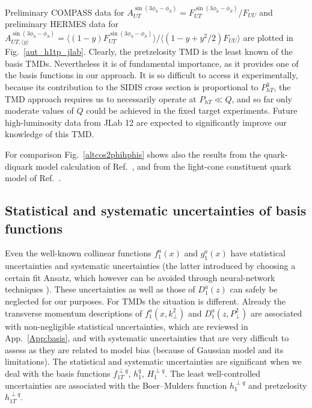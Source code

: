 \documentclass[a4paper,11pt]{article}
\newcommand{\blue}[1]{{\color{blue} #1}}
\newcommand{\la}{\langle}
\newcommand{\ra}{\rangle}
\newcommand{\ps}[1]{\blue{#1}}
\def\Phperp{P_{hT}}
\def\kperp{k_\perp}
\def\pperp{P_\perp}
\begin{document}
Preliminary COMPASS data \cite{Parsamyan:2013fia} for 
$A_{UT}^{\sin(3 \phi_h - \phi_S)}=F_{UT}^{\sin(3 \phi_h - \phi_S)}/F_{UU}$ and 
preliminary HERMES data \cite{Schnell:2010zza} for$
A_{UT, \langle y \rangle}^{\sin(3 \phi_h - \phi_S)}=\la
(1-y)F_{UT}^{\sin(3 \phi_h - \phi_S)}\ra/\la(1-y + y^2/2)F_{UU}\ra$
are plotted in Fig.~\ref{aut_h1tp_jlab}. 
Clearly, the pretzelosity TMD is the least known of the basis TMDs.
Nevertheless it is of fundamental importance, as it provides one of the
basis functions in our approach. It is so difficult to access it
experimentally, because its contribution to the SIDIS cross section
is proportional to $\Phperp^3$, the TMD approach requires us to
necessarily operate at $\Phperp\ll Q$, and so far only moderate
values of $Q$ could be achieved in the fixed target experiments.
Future high-luminosity data from JLab 12 are expected
to significantly improve our knowledge of this TMD.

For comparison Fig.~\ref{altcos2phihphis} shows also the results
from the quark-diquark model calculation of Ref.~\cite{Kotzinian:2008fe},
and from the light-cone constituent quark model of Ref.~\cite{Boffi:2009sh}.



\subsection{Statistical and systematic uncertainties of basis functions}

Even the well-known collinear functions $f_1^a(x)$ and $g_1^a(x)$ have
statistical uncertainties and systematic uncertainties (the latter
introduced by choosing a certain fit Ansatz, which however can be
avoided through neural-network techniques \cite{Ball:2014uwa}).
These uncertainties as well as those of $D_1^a(z)$ can safely
be neglected for our purposes.
For TMDs the situation is different. Already the transverse
momentum descriptions of $f_1^a(x,\kperp^{2})$ and $D_1^a(z,\pperp^{2})$
are associated with non-negligible statistical uncertainties,
which are reviewed in App.~\ref{App:basis}, and with systematic
uncertainties that are very difficult to assess as they are
related to model bias (because of Gaussian model and its limitations).
The statistical and systematic uncertainties are significant
when we deal with the basis functions
$f_{1T}^{\perp q}$, $h_{1}^{q}$, $H_{1}^{\perp q}$.
The least well-controlled uncertainties are associated with the
Boer--Mulders function $h_1^{\perp q}$ and pretzelosity $h_{1T}^{\perp q}$.
\end{document}

